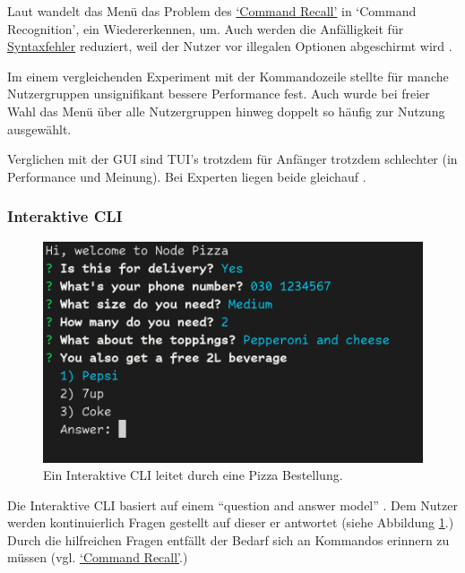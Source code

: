 \documentclass[oneside,bibliography=totocnumbered,BCOR=5mm]{scrbook}
\begin{document}
Laut \textcite{Paap_1988} wandelt das Menü das Problem des
\hyperref[prob:cr]{`Command Recall'} in `Command
Recognition', ein Wiedererkennen, um. Auch werden die Anfälligkeit für
\hyperref[prob:ss]{Syntaxfehler} reduziert, weil der Nutzer vor
illegalen Optionen abgeschirmt wird \parencite{Kantorowitz_1989}.

\smallskip

Im einem vergleichenden Experiment mit der Kommandozeile stellte
\textcite{Westerman_1997} für manche Nutzergruppen unsignifikant bessere Performance
fest. Auch wurde bei freier Wahl das Menü über alle Nutzergruppen hinweg doppelt
so häufig zur Nutzung ausgewählt.

\smallskip

Verglichen mit der GUI sind TUI's trotzdem für Anfänger trotzdem schlechter
(in Performance und Meinung). Bei Experten liegen beide gleichauf
\parencite{tuivsgui}.

\subsubsection{Interaktive CLI}
\label{sec:def-interactive}

\begin{figure}[H]
  \centering
  \includegraphics[scale=0.5]{interactive-example.png}
  \caption{Ein Interaktive CLI leitet durch eine Pizza Bestellung.}
  \label{fig:interactive-example}
\end{figure}

Die Interaktive CLI basiert auf einem ``question and answer model''
\parencite[42]{Spolsky_2001}. Dem Nutzer werden kontinuierlich Fragen gestellt
auf dieser er antwortet (siehe Abbildung \ref{fig:interactive-example}.) Durch
die hilfreichen Fragen entfällt der Bedarf sich an Kommandos erinnern zu müssen
(vgl. \hyperref[prob:cr]{`Command Recall'}.)
\end{document}
